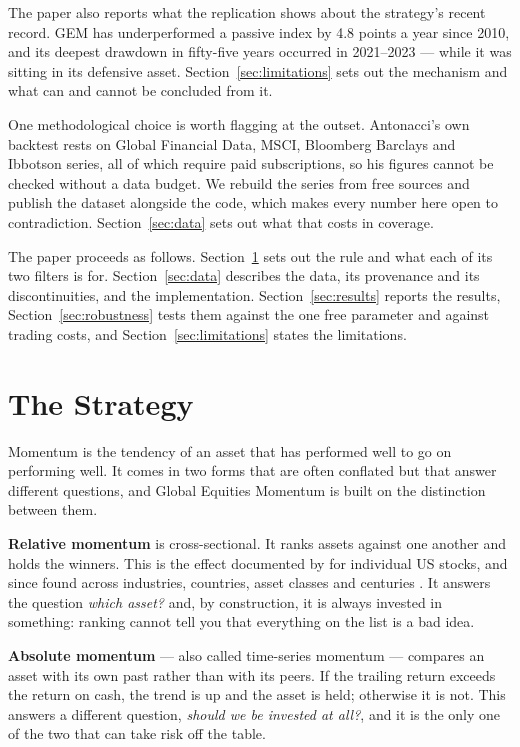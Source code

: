 \documentclass[11pt,a4paper]{article}
\begin{document}
The paper also reports what the replication shows about the strategy's recent
record. GEM has underperformed a passive index by 4.8 points a year since 2010,
and its deepest drawdown in fifty-five years occurred in 2021--2023 --- while
it was sitting in its defensive asset. Section~\ref{sec:limitations} sets out
the mechanism and what can and cannot be concluded from it.

One methodological choice is worth flagging at the outset. Antonacci's own
backtest rests on Global Financial Data, MSCI, Bloomberg Barclays and Ibbotson
series, all of which require paid subscriptions, so his figures cannot be
checked without a data budget. We rebuild the series from free sources and
publish the dataset alongside the code, which makes every number here open to
contradiction. Section~\ref{sec:data} sets out what that costs in coverage.

The paper proceeds as follows. Section~\ref{sec:strategy} sets out the rule and
what each of its two filters is for. Section~\ref{sec:data} describes the data,
its provenance and its discontinuities, and the implementation.
Section~\ref{sec:results} reports the results, Section~\ref{sec:robustness}
tests them against the one free parameter and against trading costs, and
Section~\ref{sec:limitations} states the limitations.

\section{The Strategy}
\label{sec:strategy}

Momentum is the tendency of an asset that has performed well to go on
performing well. It comes in two forms that are often conflated but that answer
different questions, and Global Equities Momentum is built on the distinction
between them.

\textbf{Relative momentum} is cross-sectional. It ranks assets against one
another and holds the winners. This is the effect documented by
\citet{jegadeesh1993} for individual US stocks, and since found across
industries, countries, asset classes and centuries
\citep{asness2013}. It answers the question
\emph{which asset?} and, by construction, it is always invested in something:
ranking cannot tell you that everything on the list is a bad idea.

\textbf{Absolute momentum} --- also called time-series momentum
\citep{moskowitz2012} --- compares an asset with its own past rather than with
its peers. If the trailing return exceeds the return on cash, the trend is up
and the asset is held; otherwise it is not. This answers a different question,
\emph{should we be invested at all?}, and it is the only one of the two that
can take risk off the table.
\end{document}
